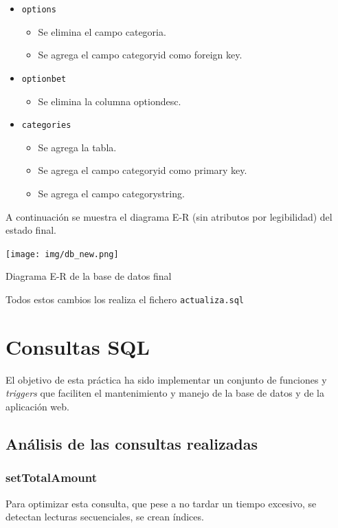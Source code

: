 \documentclass{article}
\begin{document}
\begin{itemize}
\begin{itemize}
        \end{itemize}
    \item\texttt{options}
        \begin{itemize}
            \item Se elimina el campo categoria.
            \item Se agrega el campo categoryid como foreign key.
        \end{itemize}
    \item\texttt{optionbet}
        \begin{itemize}
            \item Se elimina la columna optiondesc.
        \end{itemize}
    \item\texttt{categories}
        \begin{itemize}
            \item Se agrega la tabla.
            \item Se agrega el campo categoryid como primary key.
            \item Se agrega el campo categorystring.
        \end{itemize}
\end{itemize}
\newpage
A continuación se muestra el diagrama E-R (sin atributos por legibilidad) del estado final.
\smallbreak
\begin{minipage}{\linewidth}
    \centering
    \captionsetup{type=figure}
    \texttt{[image: img/db\_new.png]}
    \caption{Diagrama E-R de la base de datos final}
    \label{fig:fig2}
\end{minipage}

Todos estos cambios los realiza el fichero \texttt{actualiza.sql}

\section{Consultas SQL}
El objetivo de esta práctica ha sido implementar un conjunto de funciones y \textit{triggers} que faciliten el mantenimiento y manejo de la base de datos y de la aplicación web.
\subsection{Análisis de las consultas realizadas}
\subsubsection{setTotalAmount}
Para optimizar esta consulta, que pese a no tardar un tiempo excesivo, se detectan lecturas secuenciales, se crean índices.
\end{document}
